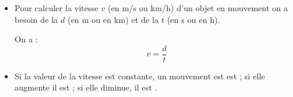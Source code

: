 \begin{mybilan}
	\begin{itemize}
		\item Pour calculer la vitesse $v$ (en m/s ou km/h) d'un objet en mouvement on a besoin de la  $d$ (en m ou en km) et de la  $t$ (en s ou en h).
		
		On a :
		\begin{equation*}
		v = \frac{d}{t}
		\end{equation*}
		
		\item Si la valeur de la vitesse est constante, un mouvement est est ; si elle augmente il est  ; si elle diminue, il est . 	
	\end{itemize}
	
	

	
	
\end{mybilan}

